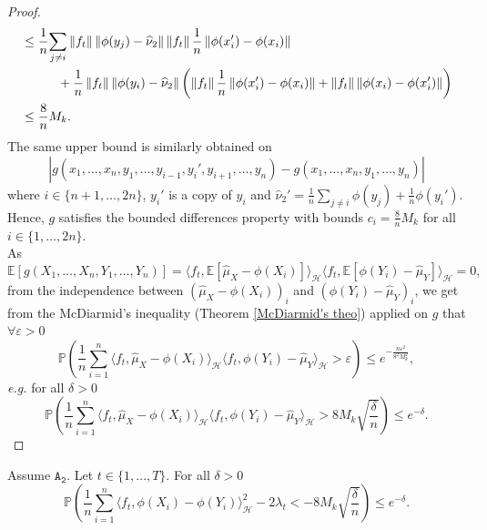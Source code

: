 \documentclass[twoside,11pt]{article}
\newcommand{\Hk}{\mathcal{H}}
\newcommand{\nb}{n}
\newcommand{\PP}{\mathbb{P}}%
\newcommand{\PPO}{\mathbb{P} }
\newcommand{\EE}{\mathbb{E}}%
\newcommand{\A}[1]{$\mathtt{A_#1}$}
\newcommand{\ti}[1]{\textit{#1}} %
\begin{document}
\begin{proof}
\begin{align*}
    & \leq \frac{1}{\nb}  \underset{j \neq i}      {\sum}  \left \| f_t \right \|  \left \| \phi(y_j) - \widehat{\nu}_2  \right \|  \left \| f_t \right \| \frac{1}{\nb}  \left \|  \phi(x_i') - \phi(x_i)  \right \| \\
    & \hspace{1 cm} + \frac{1}{\nb} \left \| f_t \right \|  \left \| \phi(y_i) - \widehat{\nu}_2  \right \|  \left( \left \| f_t \right \| \frac{1}{\nb}  \left \|  \phi(x_i') - \phi(x_i)  \right \| +  \left \| f_t \right \|  \left \|  \phi(x_i) - \phi(x_i') \right \| \right)\\ 
    & \leq \frac{8}{\nb} M_k .
 \end{align*}
The same upper bound is similarly obtained on 
$$\left | g\left(x_1,\ldots,x_{\nb},y_1,\ldots,y_{i-1},y_i',y_{i+1},\ldots,y_{\nb}\right) - g\left(x_1,\ldots,x_{\nb},y_1,\ldots,y_{\nb}\right) \right |$$ where $i \in \{\nb + 1,\ldots,2\nb\}$, $y_i'$ is a copy of $y_i$ and $\widehat{\nu}_2' = \frac{1}{\nb}  \underset{j \neq i}{\sum} \phi(y_j) + \frac{1}{\nb} \phi(y_i')$. \\
Hence, $g$ satisfies the bounded differences property with bounds $c_i=  \frac{8}{\nb} M_k$ for all $i \in \{1,\ldots,2 \nb \}$. \\
As 
$$ \EE[g\left(X_1,\ldots,X_{\nb},Y_1,\ldots,Y_{\nb}\right)] = \langle f_t, \EE[\widehat{\mu}_X - \phi(X_i)] \rangle_{\Hk} \langle f_t, \EE[\phi(Y_i)-\widehat{\mu}_Y] \rangle_{\Hk} = 0,$$
from the  independence between $(\widehat{\mu}_X - \phi(X_i))_i$ and $(\phi(Y_i) - \widehat{\mu}_Y)_i$, we get from
the McDiarmid's inequality (Theorem \ref{McDiarmid's theo}) applied on $g$ that $\forall \varepsilon >0$ 
\begin{equation*}
    \PP \left(  \frac{1}{\nb} \underset{i=1}{\overset{\nb}{\sum}} \langle f_t, \widehat{\mu}_X - \phi(X_i) \rangle_{\Hk} \langle f_t,\phi(Y_i) - \widehat{\mu}_Y  \rangle_{\Hk}> \varepsilon  \right) \leq e^{- \frac{\nb \varepsilon^2}{8^2   M_k^2}},
\end{equation*}
\ti{e.g.} for all $\delta >0$ 
\begin{equation*}
    \PP \left(  \frac{1}{\nb} \underset{i=1}{\overset{\nb}{\sum}} \langle f_t, \widehat{\mu}_X - \phi(X_i) \rangle_{\Hk} \langle f_t,\phi(Y_i) - \widehat{\mu}_Y  \rangle_{\Hk}> 8 M_k \sqrt{\frac \delta \nb}   \right) \leq e^{- \delta}.
\end{equation*}
\end{proof}
\begin{lemma}
\label{num_den_term}
Assume \A{2}. Let $t \in \{1,\ldots,T\}$. For all $\delta>0$ 
\begin{equation*}
    \PPO \left(  \frac{1}{\nb} \underset{i=1}{\overset{\nb}{\sum}} \langle f_t, \phi(X_i) - \phi(Y_i) \rangle_{\Hk}^2 - 2 \lambda_t < - 8 M_k \sqrt{\frac{\delta}{\nb}}  \right) \leq e^{- \delta}.
\end{equation*}
\end{lemma}
\end{document}
